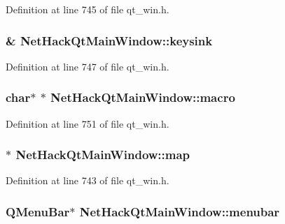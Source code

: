 Definition at line 745 of file qt\+\_\+win.\+h.

\hypertarget{classNetHackQtMainWindow_a53f62afd7386174f672bef8eff5ab2d5}{
\subsubsection[{keysink}]{\& Net\+Hack\+Qt\+Main\+Window\+::keysink\hspace{0.3cm}{\ttfamily [private]}}}\label{classNetHackQtMainWindow_a53f62afd7386174f672bef8eff5ab2d5}


Definition at line 747 of file qt\+\_\+win.\+h.

\hypertarget{classNetHackQtMainWindow_a89e6d35bbce108698a5b5062668d85fd}{
\subsubsection[{macro}]{ char$\ast$ $\ast$ Net\+Hack\+Qt\+Main\+Window\+::macro\hspace{0.3cm}{\ttfamily [private]}}}\label{classNetHackQtMainWindow_a89e6d35bbce108698a5b5062668d85fd}


Definition at line 751 of file qt\+\_\+win.\+h.

\hypertarget{classNetHackQtMainWindow_a868ce981d75ebdf4291f1bae7c73c14d}{
\subsubsection[{map}]{$\ast$ Net\+Hack\+Qt\+Main\+Window\+::map\hspace{0.3cm}{\ttfamily [private]}}}\label{classNetHackQtMainWindow_a868ce981d75ebdf4291f1bae7c73c14d}


Definition at line 743 of file qt\+\_\+win.\+h.

\hypertarget{classNetHackQtMainWindow_a30875eb8c884592225cd51d0b575ce40}{
\subsubsection[{menubar}]{\setlength{\rightskip}{0pt plus 5cm}Q\+Menu\+Bar$\ast$ Net\+Hack\+Qt\+Main\+Window\+::menubar\hspace{0.3cm}{\ttfamily [private]}}}\label{classNetHackQtMainWindow_a30875eb8c884592225cd51d0b575ce40}


